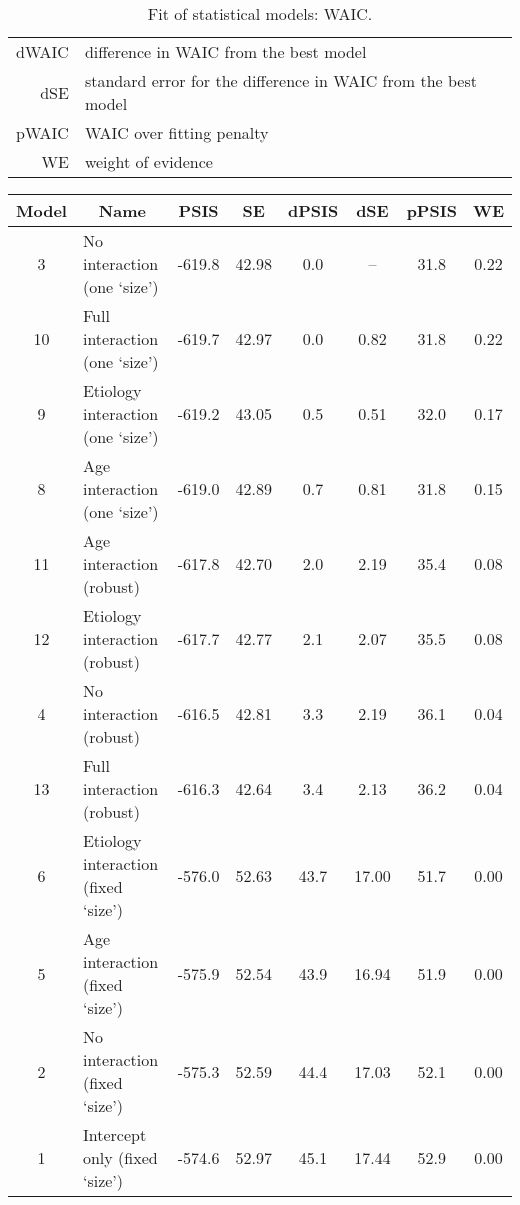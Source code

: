 \begin{table}[h!]
\begin{tabular}{|c|lcccccc|}
		\multicolumn{1}{|r|}{\small dWAIC} & \multicolumn{7}{l|}{\small difference in WAIC from the best model} \\
		\multicolumn{1}{|r|}{\small dSE} & \multicolumn{7}{l|}{\small standard error for the difference in WAIC from the best model} \\
		\multicolumn{1}{|r|}{\small pWAIC} & \multicolumn{7}{l|}{\small WAIC over fitting penalty} \\
		\multicolumn{1}{|r|}{\small WE} & \multicolumn{7}{l|}{\small weight of evidence} \\
		\hline
	\end{tabular}
	\caption[Fit of statistical models: WAIC]{Fit of statistical models: WAIC.}
	\label{tab:WAIC}
\end{table}
%
\begin{table}[h!]
	\centering
	\begin{tabular}{|c|lcccccc|} 
		\hline
		Model & \multicolumn{1}{c}{Name} & PSIS & SE & dPSIS & dSE & pPSIS & WE \\[0.5ex] 
		\hline\hline
		\rowcolor{gray}
		3 & No interaction (one `size') & -619.8 & 42.98 & 0.0 & -- & 31.8 & 0.22 \\
		10 & Full interaction (one `size') & -619.7 & 42.97 & 0.0 & 0.82 & 31.8 & 0.22 \\
		\rowcolor{gray}
		9 & Etiology interaction (one `size') & -619.2 & 43.05 & 0.5 & 0.51 & 32.0 & 0.17 \\
		8 & Age interaction (one `size') & -619.0 & 42.89 & 0.7 & 0.81 & 31.8 & 0.15 \\
		\rowcolor{gray}
		11 & Age interaction (robust) & -617.8 & 42.70 & 2.0 & 2.19 & 35.4 & 0.08 \\
		12 & Etiology interaction (robust) & -617.7 & 42.77 & 2.1 & 2.07 & 35.5 & 0.08 \\
		\rowcolor{gray}
		4 & No interaction (robust) & -616.5 & 42.81 & 3.3 & 2.19 & 36.1 & 0.04 \\
		13 & Full interaction (robust) & -616.3 & 42.64 & 3.4 & 2.13 & 36.2 & 0.04 \\
		\rowcolor{gray}
		6 & Etiology interaction (fixed `size') & -576.0 & 52.63 & 43.7 & 17.00 & 51.7 & 0.00 \\
		5 & Age interaction (fixed `size') & -575.9 & 52.54 & 43.9 & 16.94 & 51.9 & 0.00 \\
		\rowcolor{gray}
		2 & No interaction (fixed `size') & -575.3 & 52.59 & 44.4 & 17.03 & 52.1 & 0.00 \\
		1 & Intercept only (fixed `size') & -574.6 & 52.97 & 45.1 & 17.44 & 52.9 & 0.00 \\

\end{tabular}
\end{table}
